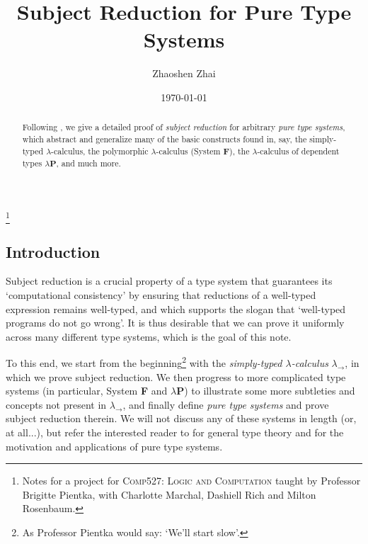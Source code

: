 \documentclass[reqno]{amsart}
\begin{document}
    \title{Subject Reduction for Pure Type Systems}
    \author{Zhaoshen Zhai}
    \address{Department of Mathematics and Statistics, McGill University, 805 Sherbrooke Street West, Montreal, QC, H3A 0B9, Canada}
    \date{\today}
    \thanks{Notes for a project for \textsc{Comp527: Logic and Computation} taught by Professor Brigitte Pientka, with Charlotte Marchal, Dashiell Rich and Milton Rosenbaum.}

    \begin{abstract}
        Following \cite{SU06}, we give a detailed proof of \textit{subject reduction} for arbitrary \textit{pure type systems}, which abstract and generalize many of the basic constructs found in, say, the simply-typed $\lambda$-calculus, the polymorphic $\lambda$-calculus (System \textbf{F}), the $\lambda$-calculus of dependent types $\lambda\mathbf{P}$, and much more.
    \end{abstract}

    \maketitle

    \subsection*{Introduction}

    Subject reduction is a crucial property of a type system that guarantees its `computational consistency' by ensuring that reductions of a well-typed expression remains well-typed, and which supports the slogan that `well-typed programs do not go wrong'. It is thus desirable that we can prove it uniformly across many different type systems, which is the goal of this note.

    To this end, we start from the beginning\footnote{As Professor Pientka would say: `We'll start slow'.} with the \textit{simply-typed $\lambda$-calculus} $\lambda_\rightarrow$, in which we prove subject reduction. We then progress to more complicated type systems (in particular, System \textbf{F} and $\lambda\mathbf{P}$) to illustrate some more subtleties and concepts not present in $\lambda_\rightarrow$, and finally define \textit{pure type systems} and prove subject reduction therein. We will not discuss any of these systems in length (or, at all...), but refer the interested reader to \cite{SU06} for general type theory and \cite{Bar91} for the motivation and applications of pure type systems.\\
\end{document}
